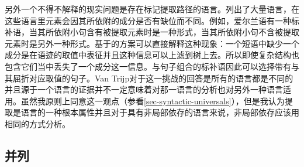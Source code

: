 另外一个不得不解释的现实问题是存在标记提取路径的语言。\citet*{BMS2001a}列出了大量语言，在这些语言里元素会因其所依附的成分是否有缺位而不同。例如，爱尔兰语有一种标补语，当其所依附小句含有被提取元素时是一种形式，当其所依附小句不含被提取元素时是另外一种形式。基于\slaschc 的方案可以直接解释这种现象：一个短语中缺少一个成分是在语迹的\slaschc 取值中表征并且这种信息可以上滤到树上去。所以即使复杂结构也包含它们当中丢失了一个成分这一信息。与句子组合的标补语因此可以选择带有与其屈折对应\slaschc 取值的句子。Van Trijp对于这一挑战的回答是所有的语言都是不同的\citep[]{vanTrijp2014a}并且源于一个语言的证据并不一定意味着对那一语言的分析也对另外一种语言适用。虽然我原则上同意这一观点（参看\ref{sec-syntactic-universals}），但是我认为提取是语言的一种根本属性并且对于具有非局部依存的语言来说，非局部依存应该用相同的方式分析。

\subsection{并列}
\label{sec-coordination}

